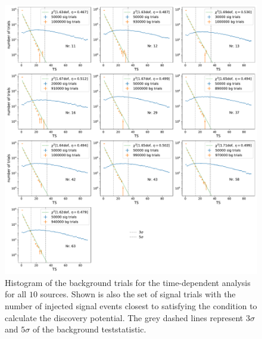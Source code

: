 \begin{figure}
    \centering
    \includegraphics[width=\linewidth]{Plots/appendix/9_years_gfu_gold_time_dep_sig_disc_ts.pdf}
    \caption{Histogram of the background trials for the time-dependent analysis for all $\num{10}$ sources. Shown is also the set of signal trials with the number of injected signal events closest to satisfying the condition to calculate the discovery potential. The grey dashed lines represent $\num{3}\sigma$ and $\num{5}\sigma$ of the background teststatistic.}
    \label{fig:time_dep_sig_disc_ts}
\end{figure}


